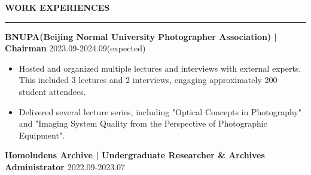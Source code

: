\documentclass[10pt]{article}
\newcommand{\cvsection}[1]{%
    \vspace{8pt}%
    \noindent\textbf{\Large #1}\\[-0.5\baselineskip]%
    \rule{\linewidth}{0.4pt}%
    \vspace{0.5\baselineskip}%
}
\begin{document}
\cvsection{WORK EXPERIENCES}

\noindent \textbf{BNUPA(Beijing Normal University Photographer Association) | Chairman} \hfill 2023.09-2024.09(expected)\\
\begin{itemize}
    \item Hosted and organized multiple lectures and interviews with external experts. This included 3 lectures and 2 interviews, engaging approximately 200 student attendees.
    \item Delivered several lecture series, including "Optical Concepts in Photography" and "Imaging System Quality from the Perspective of Photographic Equipment".
\end{itemize}\vspace{5pt}

\noindent \textbf{Homoludens Archive | Undergraduate Researcher \& Archives Administrator} \hfill 2022.09-2023.07\\
\end{document}
